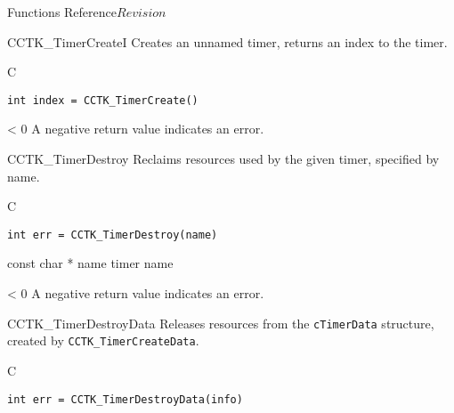 \begin{cactuspart}{ Functions Reference}{}{$Revision$}
\begin{FunctionDescription}{CCTK\_TimerCreateI}
\label{CCTK-TimerCreateI}
Creates an unnamed timer, returns an index to the timer.
\begin{SynopsisSection}
\begin{Synopsis}{C}
\begin{verbatim}
int index = CCTK_TimerCreate()
\end{verbatim}
\end{Synopsis}
\end{SynopsisSection}

\begin{ErrorSection}
\begin{Error}{< 0}
A negative return value indicates an error.
\end{Error}
\end{ErrorSection}
\end{FunctionDescription}


\begin{FunctionDescription}{CCTK\_TimerDestroy}
\label{CCTK-TimerDestroy}
Reclaims resources used by the
given timer, specified by name.
\begin{SynopsisSection}
\begin{Synopsis}{C}
\begin{verbatim}
int err = CCTK_TimerDestroy(name)
\end{verbatim}
\end{Synopsis}
\end{SynopsisSection}

\begin{ParameterSection}
\begin{Parameter} {const char * name}
timer name
\end{Parameter}
\end{ParameterSection}

\begin{ErrorSection}
\begin{Error}{< 0}
A negative return value indicates an error.
\end{Error}
\end{ErrorSection}
\end{FunctionDescription}


\begin{FunctionDescription}{CCTK\_TimerDestroyData}
\label{CCTK-TimerDestroyData}
Releases resources from the {\tt cTimerData}
structure, created by {\tt CCTK\_TimerCreateData}.
\begin{SynopsisSection}
\begin{Synopsis}{C}
\begin{verbatim}
int err = CCTK_TimerDestroyData(info)
\end{verbatim}
\end{Synopsis}
\end{SynopsisSection}


\end{FunctionDescription}
\end{cactuspart}
